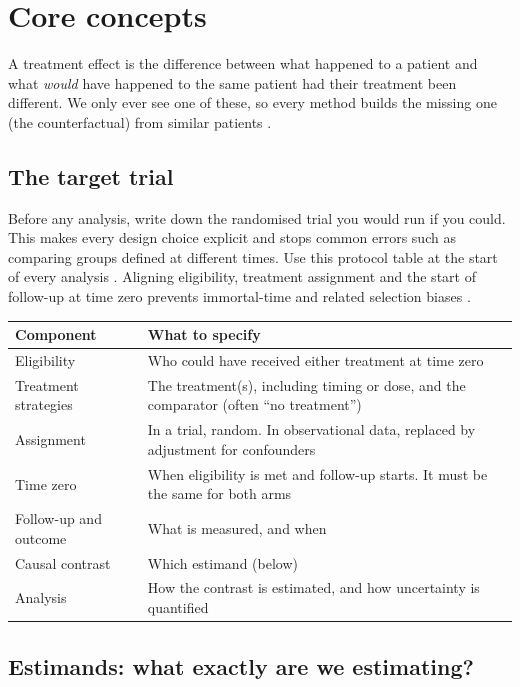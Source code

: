 \section{Core concepts}

A treatment effect is the difference between what happened to a patient and what \emph{would} have happened to the same patient had their treatment been different. We only ever see one of these, so every method builds the missing one (the counterfactual) from similar patients \cite{hernan2020whatif}.

\subsection{The target trial}

Before any analysis, write down the randomised trial you would run if you could. This makes every design choice explicit and stops common errors such as comparing groups defined at different times. Use this protocol table at the start of every analysis \cite{hernan2016bigdata,hernan2025,cashin2025}. Aligning eligibility, treatment assignment and the start of follow-up at time zero prevents immortal-time and related selection biases \cite{hernan2016immortal}.

\begin{xltabular}{\textwidth}{L{4cm}Y}
\toprule
\textbf{Component} & \textbf{What to specify} \\
\midrule
Eligibility & Who could have received either treatment at time zero \\
Treatment strategies & The treatment(s), including timing or dose, and the comparator (often ``no treatment'') \\
Assignment & In a trial, random. In observational data, replaced by adjustment for confounders \\
Time zero & When eligibility is met and follow-up starts. It must be the same for both arms \\
Follow-up and outcome & What is measured, and when \\
Causal contrast & Which estimand (below) \\
Analysis & How the contrast is estimated, and how uncertainty is quantified \\
\bottomrule
\end{xltabular}

\subsection{Estimands: what exactly are we estimating?}


